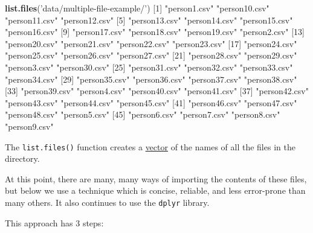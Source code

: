 \documentclass[]{article}
\newenvironment{Shaded}{\begin{snugshade}}{\end{snugshade}}
\newcommand{\DecValTok}[1]{\textcolor[rgb]{0.00,0.00,0.81}{#1}}
\newcommand{\KeywordTok}[1]{\textcolor[rgb]{0.13,0.29,0.53}{\textbf{#1}}}
\newcommand{\NormalTok}[1]{#1}
\newcommand{\StringTok}[1]{\textcolor[rgb]{0.31,0.60,0.02}{#1}}
\begin{document}
\begin{Shaded}
\begin{Highlighting}[]
\KeywordTok{list.files}\NormalTok{(}\StringTok{'data/multiple-file-example/'}\NormalTok{)}
\NormalTok{ [}\DecValTok{1}\NormalTok{] }\StringTok{"person1.csv"}  \StringTok{"person10.csv"} \StringTok{"person11.csv"} \StringTok{"person12.csv"}
\NormalTok{ [}\DecValTok{5}\NormalTok{] }\StringTok{"person13.csv"} \StringTok{"person14.csv"} \StringTok{"person15.csv"} \StringTok{"person16.csv"}
\NormalTok{ [}\DecValTok{9}\NormalTok{] }\StringTok{"person17.csv"} \StringTok{"person18.csv"} \StringTok{"person19.csv"} \StringTok{"person2.csv"} 
\NormalTok{[}\DecValTok{13}\NormalTok{] }\StringTok{"person20.csv"} \StringTok{"person21.csv"} \StringTok{"person22.csv"} \StringTok{"person23.csv"}
\NormalTok{[}\DecValTok{17}\NormalTok{] }\StringTok{"person24.csv"} \StringTok{"person25.csv"} \StringTok{"person26.csv"} \StringTok{"person27.csv"}
\NormalTok{[}\DecValTok{21}\NormalTok{] }\StringTok{"person28.csv"} \StringTok{"person29.csv"} \StringTok{"person3.csv"}  \StringTok{"person30.csv"}
\NormalTok{[}\DecValTok{25}\NormalTok{] }\StringTok{"person31.csv"} \StringTok{"person32.csv"} \StringTok{"person33.csv"} \StringTok{"person34.csv"}
\NormalTok{[}\DecValTok{29}\NormalTok{] }\StringTok{"person35.csv"} \StringTok{"person36.csv"} \StringTok{"person37.csv"} \StringTok{"person38.csv"}
\NormalTok{[}\DecValTok{33}\NormalTok{] }\StringTok{"person39.csv"} \StringTok{"person4.csv"}  \StringTok{"person40.csv"} \StringTok{"person41.csv"}
\NormalTok{[}\DecValTok{37}\NormalTok{] }\StringTok{"person42.csv"} \StringTok{"person43.csv"} \StringTok{"person44.csv"} \StringTok{"person45.csv"}
\NormalTok{[}\DecValTok{41}\NormalTok{] }\StringTok{"person46.csv"} \StringTok{"person47.csv"} \StringTok{"person48.csv"} \StringTok{"person5.csv"} 
\NormalTok{[}\DecValTok{45}\NormalTok{] }\StringTok{"person6.csv"}  \StringTok{"person7.csv"}  \StringTok{"person8.csv"}  \StringTok{"person9.csv"} 
\end{Highlighting}
\end{Shaded}

The \texttt{list.files()} function creates a \protect\hyperlink{vectors}{vector} of the names of all the
files in the directory.

At this point, there are many, many ways of importing the contents of these
files, but below we use a technique which is concise, reliable, and less
error-prone than many others. It also continues to use the \texttt{dplyr} library.

This approach has 3 steps:
\end{document}
